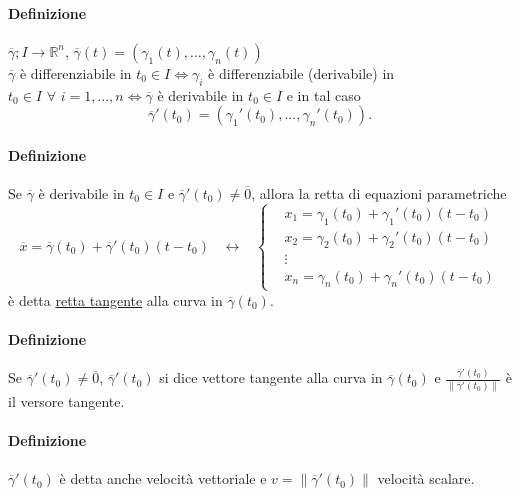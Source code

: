 \documentclass{article}
\newcommand{\R}{\mathbb{R}}
\begin{document}
\paragraph{Definizione}
$\overline{\gamma}; I \rightarrow \R^n$, $\overline{\gamma}(t)=(\gamma_1(t),...,\gamma_n(t))$\\
$\overline{\gamma}$ è differenziabile in $t_0 \in I \Leftrightarrow \gamma_i$ è differenziabile (derivabile) in $t_0 \in I \,\, \forall\,\, i =1,...,n \Leftrightarrow \overline{\gamma}$ è derivabile in $t_0 \in I$ e in tal caso
\begin{equation*}
    \overline{\gamma}'(t_0)=\left( \gamma_1'(t_0),...,\gamma_n'(t_0) \right).
\end{equation*}

\paragraph{{Definizione}}
Se $\overline{\gamma}$ è derivabile in $t_0 \in I$ e $\overline{\gamma}' (t_0)\neq \overline{0}$, allora la retta di equazioni parametriche
\begin{equation*}
    \overline{x}=\overline{\gamma}(t_0)+\overline{\gamma}'(t_0)(t-t_0) \,\,\,\,\,\longleftrightarrow\,\,\,\,\,
    \begin{cases}
        &x_1=\gamma_1(t_0)+\gamma_1'(t_0)(t-t_0)\\
        &x_2=\gamma_2(t_0)+\gamma_2'(t_0)(t-t_0)\\
        &\vdots\\
        &x_n=\gamma_n(t_0)+\gamma_n'(t_0)(t-t_0)
    \end{cases}
\end{equation*}
è detta \underline{retta tangente} alla curva in $\overline{\gamma}(t_0)$.

\paragraph{{Definizione}}
Se $\overline{\gamma}'(t_0)\neq \overline{0}$, $\overline{\gamma}'(t_0)$ si dice vettore tangente alla curva in $\overline{\gamma}(t_0)$ e $\frac{\overline{\gamma}'(t_0)}{\|\overline{\gamma}'(t_0)\|}$ è il versore tangente.

\paragraph{{Definizione}}
$\overline{\gamma}'(t_0)$ è detta anche velocità vettoriale e $v= \|\overline{\gamma}'(t_0)\|$ velocità scalare.
\end{document}

